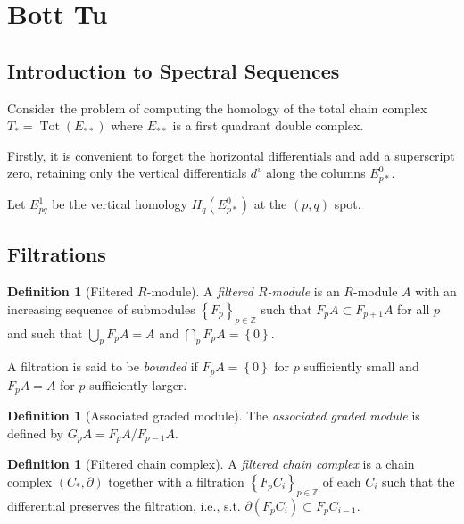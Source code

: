 \documentclass[reqno]{amsart}
\theoremstyle{definition}
\newtheorem{definition}[theorem]{Definition}
\theoremstyle{remark}
\DeclareMathOperator{\Tot}{Tot}
\begin{document}
\newpage 
\section{Bott Tu}
\subsection{Introduction to Spectral Sequences}

Consider the problem of computing the homology
of the total chain complex
$T_* = \Tot(E_{* * })$ where
$E_{* *}$ is a first quadrant double complex.

Firstly, it is convenient to forget the horizontal differentials
and add a superscript zero, retaining only the vertical
differentials $d^{v}$ along the columns
$E_{p*}^{0}$.

Let $E_{pq}^{1}$ be the vertical homology
$H_q \left( E_{p*}^{0} \right) $ at the
$(p,q)$ spot.





\subsection{Filtrations}

\begin{definition}[Filtered $R$-module]
    A \textit{filtered $R$-module} is an $R$-module
    $A$ with an increasing sequence
    of submodules 
    $\left\{ F_p \right\}_{p \in \mathbb{Z}}$ 
    such that $F_p A \subset F_{p+1}A$ for all
    $p$ and such that
    $\bigcup_{p} F_pA = A$ and
    $\bigcap_{p} F_p A = \left\{ 0 \right\} $.

    A filtration is said to be \textit{bounded} if
    $F_p A = \left\{ 0 \right\} $ for
    $p$ sufficiently small and
    $F_p A = A$ for $p$ sufficiently larger.
\end{definition}

\begin{definition}[Associated graded module]
    The \textit{associated graded module} is defined
    by $G_p A = F_p A / F_{p-1} A$.
\end{definition}

\begin{definition}[Filtered chain complex]
    A \textit{filtered chain complex} is a chain
    complex $\left( C_*, \partial \right) $ together
    with a filtration $\left\{ F_p C_i \right\}_{p \in \mathbb{Z}}$ 
    of each $C_i$ such that the differential preserves
    the filtration, i.e., s.t. 
    $\partial \left( F_p C_i \right) \subset F_p C_{i-1}$.
\end{definition}
\end{document}
